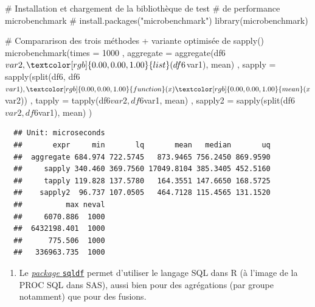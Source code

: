 \documentclass[12pt,twosided, notitlepage]{book}
\newenvironment{Shaded}{}{}
\newcommand{\KeywordTok}[1]{\textcolor[rgb]{0.00,0.00,1.00}{#1}}
\newcommand{\DataTypeTok}[1]{#1}
\newcommand{\DecValTok}[1]{#1}
\newcommand{\CommentTok}[1]{\textcolor[rgb]{0.00,0.50,0.00}{#1}}
\newcommand{\ControlFlowTok}[1]{\textcolor[rgb]{0.00,0.00,1.00}{#1}}
\newcommand{\OperatorTok}[1]{#1}
\newcommand{\NormalTok}[1]{#1}
\providecommand{\tightlist}{%
  \setlength{\itemsep}{0pt}\setlength{\parskip}{0pt}}
\renewenvironment{Shaded}{\begin{snugshade}}{\end{snugshade}}
\begin{document}
\begin{Shaded}
\begin{Highlighting}[]
\CommentTok{# Installation et chargement de la bibliothèque de test }
\CommentTok{# de performance microbenchmark}
\CommentTok{# install.packages("microbenchmark")}
\KeywordTok{library}\NormalTok{(microbenchmark)}

\CommentTok{# Compararison des trois méthodes + variante optimisée de sapply()}
\KeywordTok{microbenchmark}\NormalTok{(}\DataTypeTok{times =} \DecValTok{1000}
\NormalTok{  , }\DataTypeTok{aggregate =} \KeywordTok{aggregate}\NormalTok{(df6}\OperatorTok{$}\NormalTok{var2, }\KeywordTok{list}\NormalTok{(df6}\OperatorTok{$}\NormalTok{var1), mean)}
\NormalTok{  , }\DataTypeTok{sapply =} \KeywordTok{sapply}\NormalTok{(}\KeywordTok{split}\NormalTok{(df6, df6}\OperatorTok{$}\NormalTok{var1), }\ControlFlowTok{function}\NormalTok{(x) }\KeywordTok{mean}\NormalTok{(x}\OperatorTok{$}\NormalTok{var2))}
\NormalTok{  , }\DataTypeTok{tapply =} \KeywordTok{tapply}\NormalTok{(df6}\OperatorTok{$}\NormalTok{var2, df6}\OperatorTok{$}\NormalTok{var1, mean)}
\NormalTok{  , }\DataTypeTok{sapply2 =} \KeywordTok{sapply}\NormalTok{(}\KeywordTok{split}\NormalTok{(df6}\OperatorTok{$}\NormalTok{var2, df6}\OperatorTok{$}\NormalTok{var1), mean)}
\NormalTok{)}
\end{Highlighting}
\end{Shaded}

\begin{verbatim}
  ## Unit: microseconds
  ##       expr     min       lq       mean   median       uq
  ##  aggregate 684.974 722.5745   873.9465 756.2450 869.9590
  ##     sapply 340.460 369.7560 17049.8104 385.3405 452.5160
  ##     tapply 119.828 137.5780   164.3551 147.6650 168.5725
  ##    sapply2  96.737 107.0505   464.7128 115.4565 131.1520
  ##          max neval
  ##     6070.886  1000
  ##  6432198.401  1000
  ##      775.506  1000
  ##   336963.735  1000
\end{verbatim}

\begin{enumerate}
\def\labelenumi{\arabic{enumi}.}
\setcounter{enumi}{1}
\tightlist
\item
  Le
  \href{http://www.gettinggeneticsdone.com/2010/05/use-sql-queries-to-manipulate-data.html}{\emph{package}
  \texttt{sqldf}} permet d'utiliser le langage SQL dans R (à l'image de
  la PROC SQL dans SAS), aussi bien pour des agrégations (par groupe
  notamment) que pour des fusions.
\end{enumerate}
\end{document}
